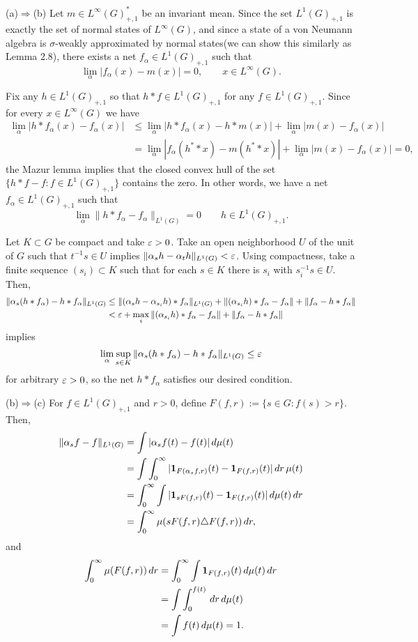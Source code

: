 \documentclass{../../small}
\begin{document}
\begin{pf}
(a)$\Rightarrow$(b)
Let $m\in L^\infty(G)^*_{+,1}$ be an invariant mean.
Since the set $L^1(G)_{+,1}$ is exactly the set of normal states of $L^\infty(G)$, and since a state of a von Neumann algebra is $\sigma$-weakly approximated by normal states(we can show this similarly as Lemma 2.8), there exists a net $f_\alpha\in L^1(G)_{+,1}$ such that
\[\lim_\alpha|f_\alpha(x)-m(x)|=0,\qquad x\in L^\infty(G).\]

Fix any $h\in L^1(G)_{+,1}$ so that $h*f\in L^1(G)_{+,1}$ for any $f\in L^1(G)_{+,1}$.
Since for every $x\in L^\infty(G)$ we have
\begin{align*}
\lim_\alpha|h*f_\alpha(x)-f_\alpha(x)|
&\le\lim_\alpha|h*f_\alpha(x)-h*m(x)|+\lim_\alpha|m(x)-f_\alpha(x)|\\
&=\lim_\alpha|f_\alpha(h^**x)-m(h^**x)|+\lim_\alpha|m(x)-f_\alpha(x)|=0,
\end{align*}
the Mazur lemma implies that the closed convex hull of the set $\{h*f-f:f\in L^1(G)_{+,1}\}$ contains the zero.
In other words, we have a net $f_\alpha\in L^1(G)_{+,1}$ such that
\[\lim_\alpha\|h*f_\alpha-f_\alpha\|_{L^1(G)}=0\qquad h\in L^1(G)_{+,1}.\]

Let $K\subset G$ be compact and take $\varepsilon>0$.
Take an open neighborhood $U$ of the unit of $G$ such that $t^{-1}s\in U$ implies $\|\alpha_sh-\alpha_th\|_{L^1(G)}<\varepsilon$.
Using compactness, take a finite sequence $(s_i)\subset K$ such that for each $s\in K$ there is $s_i$ with $s_i^{-1}s\in U$.
Then,
\begin{align*}
\|\alpha_s(h*f_\alpha)-h*f_\alpha\|_{L^1(G)}
&\le\|(\alpha_sh-\alpha_{s_i}h)*f_\alpha\|_{L^1(G)}+\|(\alpha_{s_i}h)*f_\alpha-f_\alpha\|+\|f_\alpha-h*f_\alpha\|\\
&<\varepsilon+\max_i\|(\alpha_{s_i}h)*f_\alpha-f_\alpha\|+\|f_\alpha-h*f_\alpha\|
\end{align*}
implies
\[\lim_\alpha\sup_{s\in K}\|\alpha_s(h*f_\alpha)-h*f_\alpha\|_{L^1(G)}\le\varepsilon\]
for arbitrary $\varepsilon>0$, so the net $h*f_\alpha$ satisfies our desired condition.

(b)$\Rightarrow$(c)
For $f\in L^1(G)_{+,1}$ and $r>0$, define $F(f,r):=\{s\in G:f(s)>r\}$.
Then,
\begin{align*}
\|\alpha_sf-f\|_{L^1(G)}
&=\int|\alpha_sf(t)-f(t)|\,d\mu(t)\\
&=\int\int_0^\infty|\mathbf{1}_{F(\alpha_sf,r)}(t)-\mathbf{1}_{F(f,r)}(t)|\,dr\,\mu(t)\\
&=\int_0^\infty\int|\mathbf{1}_{sF(f,r)}(t)-\mathbf{1}_{F(f,r)}(t)|\,d\mu(t)\,dr\\
&=\int_0^\infty\mu(sF(f,r)\triangle F(f,r))\,dr,
\end{align*}
and
\begin{align*}
\int_0^\infty\mu(F(f,r))\,dr
&=\int_0^\infty\int\mathbf{1}_{F(f,r)}(t)\,d\mu(t)\,dr\\
&=\int\int_0^{f(t)}\,dr\,d\mu(t)\\
&=\int f(t)\,d\mu(t)=1.
\end{align*}


\end{pf}
\end{document}
